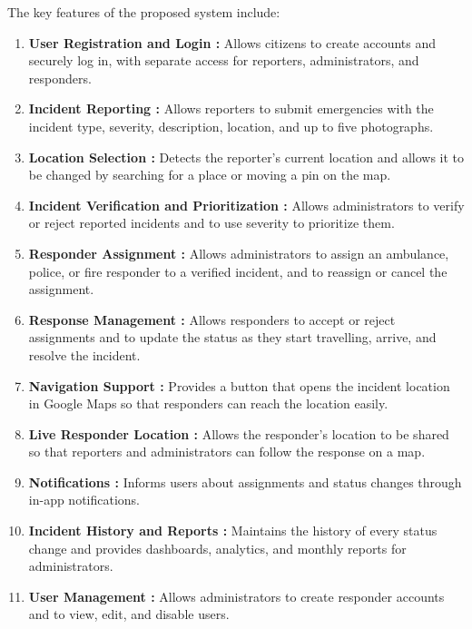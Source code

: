 \documentclass[a4paper,12pt]{report}
\begin{document}
	The key features of the proposed system include:
	\begin{enumerate}
		\item \textbf{User Registration and Login :} Allows citizens to create accounts and securely log in, with separate access for reporters, administrators, and responders.
		
		\item \textbf{Incident Reporting :} Allows reporters to submit emergencies with the incident type, severity, description, location, and up to five photographs.
		
		\item \textbf{Location Selection :} Detects the reporter's current location and allows it to be changed by searching for a place or moving a pin on the map.
		
		\item \textbf{Incident Verification and Prioritization :} Allows administrators to verify or reject reported incidents and to use severity to prioritize them.
		
		\item \textbf{Responder Assignment :} Allows administrators to assign an ambulance, police, or fire responder to a verified incident, and to reassign or cancel the assignment.
		
		\item \textbf{Response Management :} Allows responders to accept or reject assignments and to update the status as they start travelling, arrive, and resolve the incident.
		
		\item \textbf{Navigation Support :} Provides a button that opens the incident location in Google Maps so that responders can reach the location easily.
		
		\item \textbf{Live Responder Location :} Allows the responder's location to be shared so that reporters and administrators can follow the response on a map.
		
		\item \textbf{Notifications :} Informs users about assignments and status changes through in-app notifications.
		
		\item \textbf{Incident History and Reports :} Maintains the history of every status change and provides dashboards, analytics, and monthly reports for administrators.
		
		\item \textbf{User Management :} Allows administrators to create responder accounts and to view, edit, and disable users.
	\end{enumerate}
	
\end{document}
